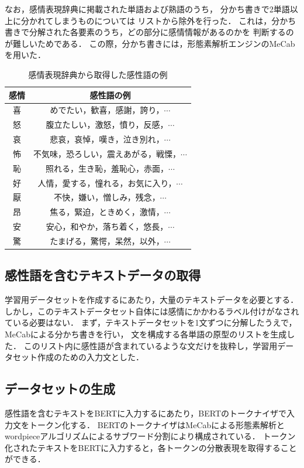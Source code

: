 			なお，感情表現辞典に掲載された単語および熟語のうち，
			分かち書きで2単語以上に分かれてしまうものについては
			リストから除外を行った．
			これは，分かち書きで分解された各要素のうち，どの部分に感情情報があるのかを
			判断するのが難しいためである．
			この際，分かち書きには，形態素解析エンジンのMeCab\cite{mecab}を用いた．
			\begin{table}[H]
				\caption{感情表現辞典から取得した感性語の例}
				\label{table:kansei_words}
				\centering
					\begin{tabular}{cc}
						\hline
						感情 & 感性語の例 \\
						\hline \hline
						喜 & めでたい，歓喜，感謝，誇り，$\cdots$ \\
						怒 & 腹立たしい，激怒，憤り，反感，$\cdots$ \\
						哀 & 悲哀，哀悼，嘆き，泣き別れ，$\cdots$ \\
						怖 & 不気味，恐ろしい，震えあがる，戦慄，$\cdots$ \\
						恥 & 照れる，生き恥，羞恥心，赤面，$\cdots$ \\
						好 & 人情，愛する，憧れる，お気に入り，$\cdots$ \\
						厭 & 不快，嫌い，憎しみ，残念，$\cdots$ \\
						昂 & 焦る，緊迫，ときめく，激情，$\cdots$ \\
						安 & 安心，和やか，落ち着く，悠長，$\cdots$ \\
						驚 & たまげる，驚愕，呆然，以外，$\cdots$ \\
						\hline
					\end{tabular}
				\end{table}

		\subsection{感性語を含むテキストデータの取得}
			学習用データセットを作成するにあたり，大量のテキストデータを必要とする．
			しかし，このテキストデータセット自体には感情にかかわるラベル付けがなされている必要はない．
			まず，テキストデータセットを1文ずつに分解したうえで，MeCabによる分かち書きを行い，
			文を構成する各単語の原型のリストを生成した．
			このリスト内に感性語が含まれているような文だけを抜粋し，学習用データセット作成のための入力文とした．

		\subsection{データセットの生成}
			感性語を含むテキストをBERTに入力するにあたり，BERTのトークナイザで入力文をトークン化する．
			BERTのトークナイザはMeCabによる形態素解析とwordpieceアルゴリズムによるサブワード分割により構成されている．
			トークン化されたテキストをBERTに入力すると，各トークンの分散表現を取得することができる．

